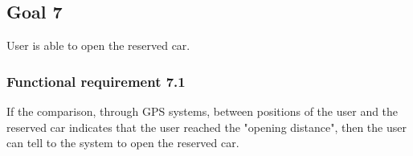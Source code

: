 \subsection{Goal 7}
User is able to open the reserved car.

\setcounter{secnumdepth}{3}
\subsubsection{Functional requirement 7.1}
If the comparison, through GPS systems, between positions of the user and the reserved car indicates that the user reached the "opening distance", then the user can tell to the system to open the reserved car.